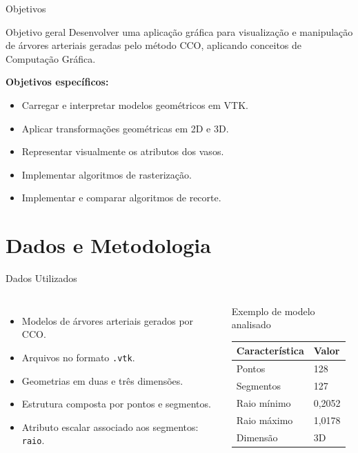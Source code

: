 \documentclass[aspectratio=169,11pt]{beamer}
\begin{document}
\begin{frame}{Objetivos}
\begin{block}{Objetivo geral}
Desenvolver uma aplicação gráfica para visualização e
manipulação de árvores arteriais geradas pelo método CCO,
aplicando conceitos de Computação Gráfica.
\end{block}

\vspace{0.3cm}

\textbf{Objetivos específicos:}
\begin{itemize}
    \item Carregar e interpretar modelos geométricos em VTK.
    \item Aplicar transformações geométricas em 2D e 3D.
    \item Representar visualmente os atributos dos vasos.
    \item Implementar algoritmos de rasterização.
    \item Implementar e comparar algoritmos de recorte.
\end{itemize}
\end{frame}

\section{Dados e Metodologia}

\begin{frame}{Dados Utilizados}
\begin{columns}[T]

\begin{itemize}
    \item Modelos de árvores arteriais gerados por CCO.
    \item Arquivos no formato \texttt{.vtk}.
    \item Geometrias em duas e três dimensões.
    \item Estrutura composta por pontos e segmentos.
    \item Atributo escalar associado aos segmentos: \texttt{raio}.
\end{itemize}


\begin{block}{Exemplo de modelo analisado}
\small
\begin{tabular}{ll}
\toprule
Característica & Valor \\
\midrule
Pontos & 128 \\
Segmentos & 127 \\
Raio mínimo & 0,2052 \\
Raio máximo & 1,0178 \\
Dimensão & 3D \\
\bottomrule
\end{tabular}
\end{block}

\end{columns}
\end{frame}
\end{document}
